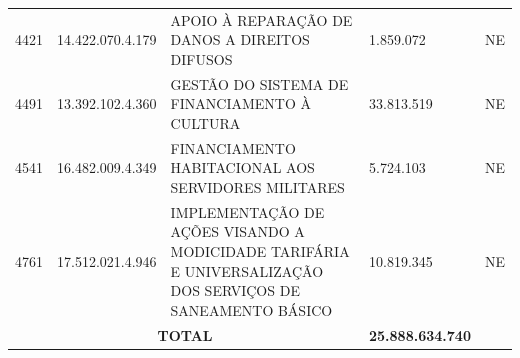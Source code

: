 \documentclass{article}
\begin{document}
\begin{longtable}[c]{m{1cm}|m{2cm}|m{10cm}|m{2cm}|m{1cm}}
\multicolumn{1}{C{1cm}|}{4421} & \multicolumn{1}{C{2cm}|}{14.422.070.4.179} & \multicolumn{1}{L{10cm}|}{APOIO À REPARAÇÃO DE DANOS A DIREITOS DIFUSOS} & \multicolumn{1}{R{2cm}|}{1.859.072} & \multicolumn{1}{C{1cm}}{NE} \\
\multicolumn{1}{C{1cm}|}{4491} & \multicolumn{1}{C{2cm}|}{13.392.102.4.360} & \multicolumn{1}{L{10cm}|}{GESTÃO DO SISTEMA DE FINANCIAMENTO À CULTURA} & \multicolumn{1}{R{2cm}|}{33.813.519} & \multicolumn{1}{C{1cm}}{NE} \\
\multicolumn{1}{C{1cm}|}{4541} & \multicolumn{1}{C{2cm}|}{16.482.009.4.349} & \multicolumn{1}{L{10cm}|}{FINANCIAMENTO HABITACIONAL AOS SERVIDORES MILITARES} & \multicolumn{1}{R{2cm}|}{5.724.103} & \multicolumn{1}{C{1cm}}{NE} \\
\multicolumn{1}{C{1cm}|}{4761} & \multicolumn{1}{C{2cm}|}{17.512.021.4.946} & \multicolumn{1}{L{10cm}|}{IMPLEMENTAÇÃO DE AÇÕES VISANDO A MODICIDADE TARIFÁRIA E UNIVERSALIZAÇÃO DOS SERVIÇOS DE SANEAMENTO BÁSICO} & \multicolumn{1}{R{2cm}|}{10.819.345} & \multicolumn{1}{C{1cm}}{NE} \\
\hline\hline
\multicolumn{3}{c|}{ \textbf{TOTAL}} & \multicolumn{1}{R{2cm}|}{ \textbf{25.888.634.740}} &  \\\hline\hline\end{longtable}\vspace{-0.4cm} \raggedright\fontsize{8pt}{10pt}\selectfont {*Legenda:} \\\fontsize{8pt}{10pt}\selectfont {(E) Exclusiva e (NE) Não Exclusiva} \\\fontsize{8pt}{10pt}\selectfont {NOTA:}\\\fontsize{8pt}{10pt}\selectfont {A metodologia do OCA foi desenvolvida pelo UNICEF, em parceria com o Instituto de Estudos Socioeconômicos - INESC - e com a Fundação Abrinq, e é recomendada pelo Conanda. Para as ações não exclusivas os valores foram calculados proporcionalmente à população de crianças e adolescentes (0 a 18 anos).}\\\fontsize{8pt}{10pt}\selectfont {Cálculo da população de crianças e adolescentes segundo dados do IBGE - Censo 2022.}\\
\end{document}
